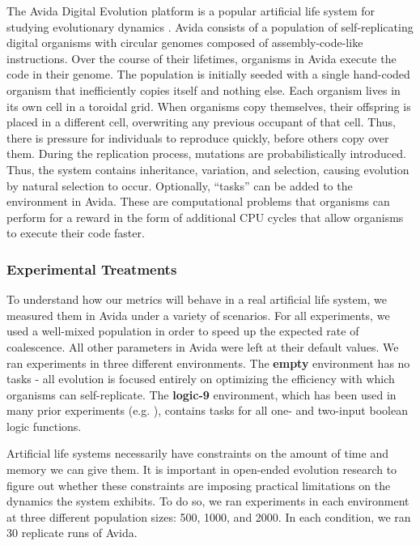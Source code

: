 \documentclass[letterpaper]{article}
\begin{document}
The Avida Digital Evolution platform is a popular artificial life system for studying evolutionary dynamics \citep{ofria_avida:_2004}. Avida consists of a population of self-replicating digital organisms with circular genomes composed of assembly-code-like instructions. Over the course of their lifetimes, organisms in Avida execute the code in their genome. The population is initially seeded with a single hand-coded organism that inefficiently copies itself and nothing else. Each organism lives in its own cell in a toroidal grid. When organisms copy themselves, their offspring is placed in a different cell, overwriting any previous occupant of that cell. Thus, there is pressure for individuals to reproduce quickly, before others copy over them. During the replication process, mutations are probabilistically introduced. Thus, the system contains inheritance, variation, and selection, causing evolution by natural selection to occur. Optionally, ``tasks'' can be added to the environment in Avida. These are computational problems that organisms can perform for a reward in the form of additional CPU cycles that allow organisms to execute their code faster.

\subsubsection{Experimental Treatments}
To understand how our metrics will behave in a real artificial life system, we measured them in Avida under a variety of scenarios. For all experiments, we used a well-mixed population in order to speed up the expected rate of coalescence. All other parameters in Avida were left at their default values. We ran experiments in three different environments. The \textbf{empty} environment has no tasks - all evolution is focused entirely on optimizing the efficiency with which organisms can self-replicate. The \textbf{logic-9} environment, which has been used in many prior experiments (e.g. \citep{lenski_evolutionary_2003}), contains tasks for all one- and two-input boolean logic functions.

Artificial life systems necessarily have constraints on the amount of time and memory we can give them. It is important in open-ended evolution research to figure out whether these constraints are imposing practical limitations on the dynamics the system exhibits. To do so, we ran experiments in each environment at three different population sizes: 500, 1000, and 2000. In each condition, we ran 30 replicate runs of Avida.
\end{document}
